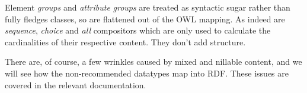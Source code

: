 Element {\itshape groups\/} and {\itshape attribute\/} {\itshape groups\/} are treated as syntactic sugar rather than fully fledges classes, so are flattened out of the OWL mapping. As indeed are {\itshape sequence\/}, {\itshape choice\/} and {\itshape all\/} compositors which are only used to calculate the cardinalities of their respective content. They don't add structure.

There are, of course, a few wrinkles caused by mixed and nillable content, and we will see how the non-\/recommended datatypes map into RDF. These issues are covered in the relevant documentation. 